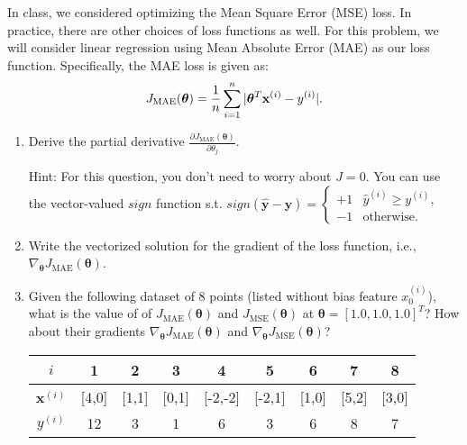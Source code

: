 \documentclass[11pt]{article}
\begin{document}
In class, we considered optimizing the Mean Square Error (MSE) loss. In practice, there are other choices of loss functions as well. For this problem, we will consider linear regression using Mean Absolute Error (MAE) as our loss function. Specifically, 
the MAE loss is given as:
\begin{equation}
J_{\text {MAE}}(\boldsymbol\theta) =  \frac{1}{n}\sum_{i=1}^{n}{| \boldsymbol\theta^T{\mathbf{x}}^{(i)} - y^{(i)}|}.
\label{lr}
\end{equation}

\begin{enumerate}
\item {} Derive the partial derivative $\frac{\partial J_{\text {MAE}}(\boldsymbol\theta)}{\partial \theta_j}$. 

Hint: For this question, you don't need to worry about $J=0$. You can use the vector-valued $sign$ function s.t. $sign(\boldsymbol{\hat{y}}-\boldsymbol y) = 
    \begin{cases}
        +1 & \hat{y}^{(i)}\geq y^{(i)},\\
        -1 & \text{otherwise}.
    \end{cases}$


\item {} Write the vectorized solution for the gradient of the loss function, i.e., $\nabla_{\boldsymbol\theta} J_{\text {MAE}}(\boldsymbol\theta)$.

\item {} 

Given the following dataset of 8 points (listed without bias feature $x^{(i)}_0$), what is the value of of $J_{\text {MAE}}(\boldsymbol\theta)$ and $J_{\text {MSE}}(\boldsymbol\theta)$ at $\boldsymbol\theta = [1.0, 1.0, 1.0]^T$? How about their gradients $\nabla_{\boldsymbol\theta} J_{\text {MAE}}(\boldsymbol\theta)$ and $\nabla_{\boldsymbol\theta} J_{\text {MSE}}(\boldsymbol\theta)$?
\begin{table}[H]
\centering
\begin{tabular}{|c|c|c|c|c|c|c|c|c|}
 \hline
$i$ & 1 & 2 & 3 & 4 & 5 & 6 & 7 & 8 \\ \hline
$\boldsymbol x^{(i)}$ & {[}4,0{]} & {[}1,1{]} & {[}0,1{]} & {[}-2,-2{]} & {[}-2,1{]} & {[}1,0{]} & {[}5,2{]} & {[}3,0{]} \\ \hline
$y^{(i)}$ & 12 & 3 & 1 & 6 & 3 & 6 & 8 & 7 \\  \hline
\end{tabular}
\end{table}

\end{enumerate}
\end{document}
